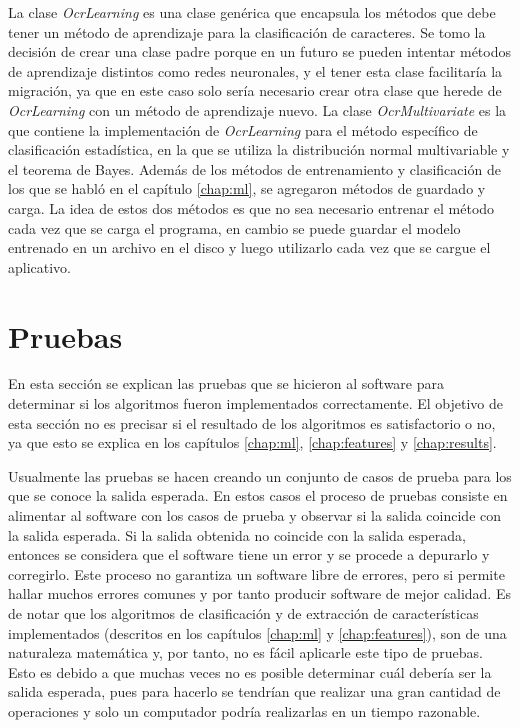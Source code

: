 \documentclass[a4paper, 11pt, oneside]{report}
\begin{document}
La clase {\it OcrLearning} es una clase genérica que encapsula los métodos que debe tener un método de aprendizaje para la clasificación de caracteres. Se tomo la decisión de crear una clase padre porque en un futuro se pueden intentar métodos de aprendizaje distintos como redes neuronales, y el tener esta clase facilitaría la migración, ya que en este caso solo sería necesario crear otra clase que herede de {\it OcrLearning} con un método de aprendizaje nuevo. La clase {\it OcrMultivariate} es la que contiene la implementación de {\it OcrLearning} para el método específico de clasificación estadística, en la que se utiliza la distribución normal multivariable y el teorema de Bayes. Además de los métodos de entrenamiento y clasificación de los que se habló en el capítulo \ref{chap:ml}, se agregaron métodos de guardado y carga. La idea de estos dos métodos es que no sea necesario entrenar el método cada vez que se carga el programa, en cambio se puede guardar el modelo entrenado en un archivo en el disco y luego utilizarlo cada vez que se cargue el aplicativo.

\section{Pruebas}

En esta sección se explican las pruebas que se hicieron al software para determinar si los algoritmos fueron implementados correctamente. El objetivo de esta sección no es precisar si el resultado de los algoritmos es satisfactorio o no, ya que esto se explica en los capítulos \ref{chap:ml}, \ref{chap:features} y \ref{chap:results}.

Usualmente las pruebas se hacen creando un conjunto de casos de prueba para los que se conoce la salida esperada. En estos casos el proceso de pruebas consiste en alimentar al software con los casos de prueba y observar si la salida coincide con la salida esperada. Si la salida obtenida no coincide con la salida esperada, entonces se considera que el software tiene un error y se procede a depurarlo y corregirlo. Este proceso no garantiza un software libre de errores, pero si permite hallar muchos errores comunes y por tanto producir software de mejor calidad. Es de notar que los algoritmos de clasificación y de extracción de características implementados (descritos en los capítulos \ref{chap:ml} y \ref{chap:features}), son de una naturaleza matemática y, por tanto, no es fácil aplicarle este tipo de pruebas. Esto es debido a que muchas veces no es posible determinar cuál debería ser la salida esperada, pues para hacerlo se tendrían que realizar una gran cantidad de operaciones y solo un computador podría realizarlas en un tiempo razonable. 
\end{document}
